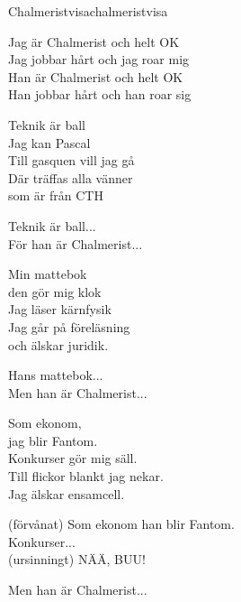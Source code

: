 \begin{song}{Chalmeristvisa}{chalmeristvisa}

\begin{vers}
Jag är Chalmerist och helt OK \\
Jag jobbar hårt och jag roar mig\\
Han är Chalmerist och helt OK\\
Han jobbar hårt och han roar sig\\
\end{vers}
\begin{vers}
Teknik är ball \\
Jag kan Pascal\\
Till gasquen vill jag gå\\
Där träffas alla vänner\\
som är från CTH\\
\end{vers}
\begin{vers}
Teknik är ball...\\
För han är Chalmerist...\\
\end{vers}
\begin{vers}
Min mattebok \\
den gör mig klok\\
Jag läser kärnfysik\\
Jag går på föreläsning\\
och älskar juridik.\\
\end{vers}
\begin{vers}
Hans mattebok...\\
Men han är Chalmerist...\\
\end{vers}

\newp

\begin{vers}
Som ekonom,\\
jag blir Fantom.\\
Konkurser gör mig säll.\\
Till flickor blankt jag nekar.\\
Jag älskar ensamcell.\\
\end{vers}
\begin{vers}
(förvånat) Som ekonom han blir Fantom.\\
Konkurser...\\
(ursinningt) NÄÄ, BUU!\\
\end{vers}
\begin{vers}
Men han är Chalmerist...\\
\end{vers}
\end{song}
